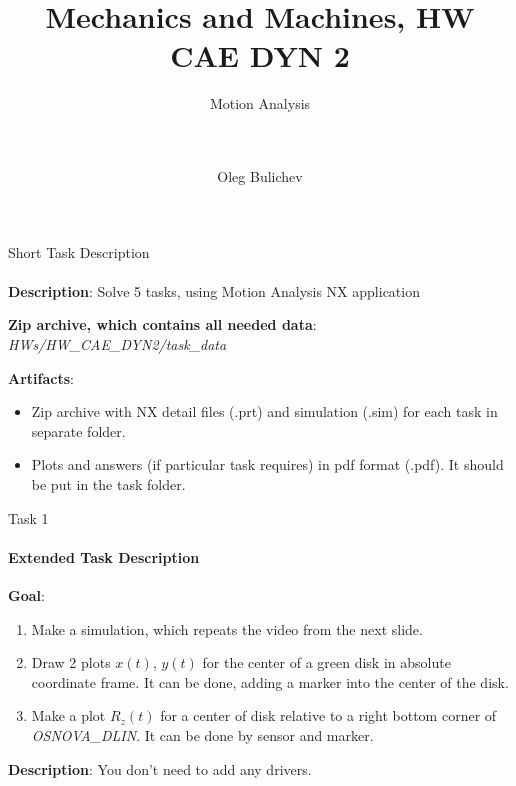 \documentclass[aspectratio=169]{beamer}
\title[MaM]{Mechanics and Machines, HW CAE DYN 2} %
\subtitle{Motion Analysis
\\ \  \\ \ 
         } %
\author{Oleg Bulichev}
\newcommand{\fbckg}[1]{\usebackgroundtemplate{\texttt{[image: \#1]}}}%
\begin{document}
\setlength{\abovedisplayskip}{0pt}
\setlength{\belowdisplayskip}{0pt}
\setlength{\abovedisplayshortskip}{0pt}
\setlength{\belowdisplayshortskip}{0pt}

\fbckg{fibeamer/figs/title_page.png}

\fbckg{fibeamer/figs/common.png}

\note{\scriptsize \begin{itemize}
        \item \
    \end{itemize}}

\note{
    \
}

\begin{frame}[t]{Short Task Description}
    \framesubtitle{}
    \textbf{Description}: Solve 5 tasks, using Motion Analysis NX application

    \textbf{Zip archive, which contains all needed data}: \textit{HWs/HW\_CAE\_DYN2/task\_data}

    \textbf{Artifacts}:
    \begin{itemize}
        \item Zip archive with NX detail files (.prt) and simulation (.sim) for each task in separate folder.
        \item Plots and answers (if particular task requires) in pdf format (.pdf). It should be put in the task folder.
    \end{itemize}
\end{frame}

\begin{frame}[t]{Task 1}
    \framesubtitle{Extended Task Description}
    \textbf{Goal}: \begin{enumerate}
        \item Make a simulation, which repeats the video from the next slide.
        \item Draw 2 plots $x(t)$, $y(t)$ for the center of a green disk in absolute coordinate frame. It can be done, adding a marker into the center of the disk.
        \item Make a plot $R_z(t)$ for a center of disk relative to a right bottom corner of \textit{OSNOVA\_DLIN}. It can be done by sensor and marker.
    \end{enumerate}
    \smallskip

    \textbf{Description}: You don't need to add any drivers. 
\end{frame}
\end{document}
